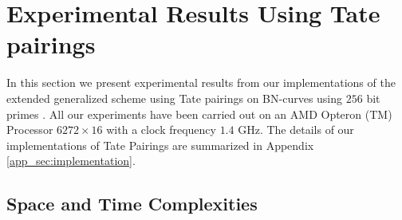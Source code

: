 \section{Experimental Results Using Tate pairings}
\label{sec:results}

In this section we present experimental results from our implementations of the extended generalized scheme using Tate pairings on BN-curves using $256$ bit primes \cite{ghosh2013secure}. All our experiments have been carried out on an AMD Opteron (TM) Processor $6272\times16$ with a clock frequency $1.4$ GHz. The details of our implementations of Tate Pairings are summarized in Appendix \ref{app_sec:implementation}.

\subsection{Space and Time Complexities}

\begin{table}[!t]
\centering
\captionsetup{font=scriptsize}
\caption{Space Complexities}
\label{tab:space}
\end{table}

